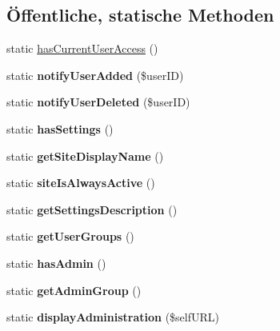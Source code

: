\subsection*{Öffentliche, statische Methoden}
\begin{DoxyCompactItemize}
\item 
static \mbox{\hyperlink{classausleihe_a1ba1a7a8985d74db6bd3a2520aafdfac}{has\+Current\+User\+Access}} ()
\item 
\mbox{\label{classausleihe_a85dcd5ecde6360b13baab58e0faeb304}} 
static {\bfseries notify\+User\+Added} (\$user\+ID)
\item 
\mbox{\label{classausleihe_ac7f204775db7bf289cff7fcaa8420f4a}} 
static {\bfseries notify\+User\+Deleted} (\$user\+ID)
\item 
\mbox{\label{classausleihe_af2b934fd01967ccffb2d4102abacdc43}} 
static {\bfseries has\+Settings} ()
\item 
\mbox{\label{classausleihe_a728e1830e4c937c321bf9ad4bf188e7d}} 
static {\bfseries get\+Site\+Display\+Name} ()
\item 
\mbox{\label{classausleihe_af3880892549ac35a51ad1ea267468d8d}} 
static {\bfseries site\+Is\+Always\+Active} ()
\item 
\mbox{\label{classausleihe_aed5ab42dba909a07f046cecd416a6fc1}} 
static {\bfseries get\+Settings\+Description} ()
\item 
\mbox{\label{classausleihe_a0fb7474a86c48de23b2e150bdd147465}} 
static {\bfseries get\+User\+Groups} ()
\item 
\mbox{\label{classausleihe_ac5dc2a6c993eb8d3252bff810e4c4316}} 
static {\bfseries has\+Admin} ()
\item 
\mbox{\label{classausleihe_aabfd2f4fe9c14050e13d4a1b4f951565}} 
static {\bfseries get\+Admin\+Group} ()
\item 
\mbox{\label{classausleihe_ab7c7160e395d41e7e59c3a311d149c53}} 
static {\bfseries display\+Administration} (\$self\+U\+RL)

\end{DoxyCompactItemize}
